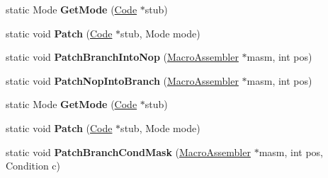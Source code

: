 \begin{DoxyCompactItemize}
\item 
static Mode {\bfseries Get\+Mode} (\hyperlink{classv8_1_1internal_1_1_code}{Code} $\ast$stub)\hypertarget{classv8_1_1internal_1_1_record_write_stub_af0f27fcc028caac49bec6438383cd51e}{}\label{classv8_1_1internal_1_1_record_write_stub_af0f27fcc028caac49bec6438383cd51e}

\item 
static void {\bfseries Patch} (\hyperlink{classv8_1_1internal_1_1_code}{Code} $\ast$stub, Mode mode)\hypertarget{classv8_1_1internal_1_1_record_write_stub_ac3c961dc847aeabf6b3d8034de93c8a1}{}\label{classv8_1_1internal_1_1_record_write_stub_ac3c961dc847aeabf6b3d8034de93c8a1}

\item 
static void {\bfseries Patch\+Branch\+Into\+Nop} (\hyperlink{classv8_1_1internal_1_1_macro_assembler}{Macro\+Assembler} $\ast$masm, int pos)\hypertarget{classv8_1_1internal_1_1_record_write_stub_a50dd0cf37a008b46bcedb2350c39a3a1}{}\label{classv8_1_1internal_1_1_record_write_stub_a50dd0cf37a008b46bcedb2350c39a3a1}

\item 
static void {\bfseries Patch\+Nop\+Into\+Branch} (\hyperlink{classv8_1_1internal_1_1_macro_assembler}{Macro\+Assembler} $\ast$masm, int pos)\hypertarget{classv8_1_1internal_1_1_record_write_stub_a55df913981d78a9535b78d8894a33bd7}{}\label{classv8_1_1internal_1_1_record_write_stub_a55df913981d78a9535b78d8894a33bd7}

\item 
static Mode {\bfseries Get\+Mode} (\hyperlink{classv8_1_1internal_1_1_code}{Code} $\ast$stub)\hypertarget{classv8_1_1internal_1_1_record_write_stub_af0f27fcc028caac49bec6438383cd51e}{}\label{classv8_1_1internal_1_1_record_write_stub_af0f27fcc028caac49bec6438383cd51e}

\item 
static void {\bfseries Patch} (\hyperlink{classv8_1_1internal_1_1_code}{Code} $\ast$stub, Mode mode)\hypertarget{classv8_1_1internal_1_1_record_write_stub_ac3c961dc847aeabf6b3d8034de93c8a1}{}\label{classv8_1_1internal_1_1_record_write_stub_ac3c961dc847aeabf6b3d8034de93c8a1}

\item 
static void {\bfseries Patch\+Branch\+Cond\+Mask} (\hyperlink{classv8_1_1internal_1_1_macro_assembler}{Macro\+Assembler} $\ast$masm, int pos, Condition c)\hypertarget{classv8_1_1internal_1_1_record_write_stub_a58c394f9a54276c07e04359c0ca7cf05}{}\label{classv8_1_1internal_1_1_record_write_stub_a58c394f9a54276c07e04359c0ca7cf05}


\end{DoxyCompactItemize}
